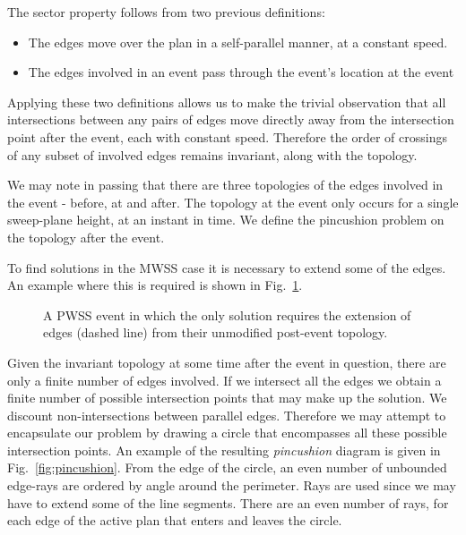 The sector property follows from two previous definitions:
\begin{itemize}
\item{The edges move over the plan in a self-parallel manner, at a constant speed.}
\item{The edges involved in an event pass through the event's location at the event}
\end{itemize}
Applying these two definitions allows us to make the trivial observation that all intersections between any pairs of edges move directly away from the intersection point after the event, each with constant speed. Therefore the order of crossings of any subset of involved edges remains invariant, along with the topology.

We may note in passing that there are three topologies of the edges involved in the event - before, at and after. The topology at the event only occurs for a single sweep-plane height, at an instant in time. We define the pincushion problem on the topology after the event.

To find solutions in the MWSS case it is necessary to extend some of the edges. An example where this is required is shown in Fig.~\ref{fig:pwss_extenstions_required}.

\begin{figure}
  \centering
  \def\svgwidth{0.7\columnwidth}
  
  \caption[Edges become rays in the pincushion problem]{\label{fig:pwss_extenstions_required}A PWSS event in which the only solution requires the extension of edges (dashed line) from their unmodified post-event topology.}
\end{figure}

Given the invariant topology at some time after the event in question, there are only a finite number of edges involved. If we intersect all the edges we obtain a finite number of possible intersection points that may make up the solution. We discount non-intersections between parallel edges. Therefore we may attempt to encapsulate our problem by drawing a circle that encompasses all these possible intersection points. An example of the resulting \emph{pincushion} diagram is given in Fig.~\ref{fig:pincushion}. From the edge of the circle, an even number of unbounded edge-rays are ordered by angle around the perimeter. Rays are used since we may have to extend some of the line segments. There are an even number of rays, for each edge of the active plan that enters and leaves the circle.

